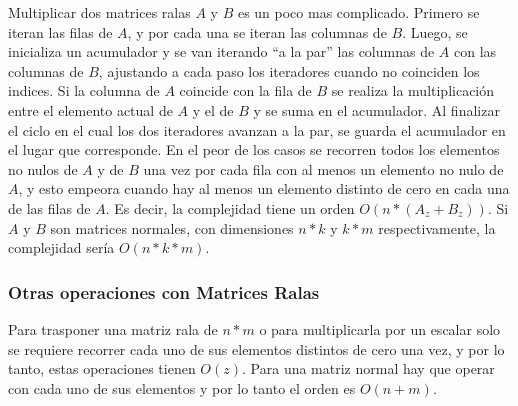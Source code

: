 Multiplicar dos matrices ralas $A$ y $B$ es un poco mas complicado. Primero se
iteran las filas de $A$, y por cada una se iteran las columnas de $B$. Luego,
se inicializa un acumulador y se van iterando ``a la par'' las columnas de $A$
con las columnas de $B$, ajustando a cada paso los iteradores cuando no
coinciden los indices. Si la columna de $A$ coincide con la fila de $B$ se
realiza la multiplicación entre el elemento actual de $A$ y el de $B$ y se suma
en el acumulador. Al finalizar el ciclo en el cual los dos iteradores avanzan a
la par, se guarda el acumulador en el lugar que corresponde. En el peor de los
casos se recorren todos los elementos no nulos de $A$ y de $B$ una vez por cada
fila con al menos un elemento no nulo de $A$, y esto empeora cuando hay al menos
un elemento distinto de cero en cada una de las filas de $A$. Es decir, la
complejidad tiene un orden $O(n * (A_z + B_z))$. Si $A$ y $B$ son matrices
normales, con dimensiones $n * k$ y $k * m$ respectivamente, la complejidad
sería $O(n * k * m)$.

\subsubsection{Otras operaciones con Matrices Ralas}

Para trasponer una matriz rala de $n * m$ o para multiplicarla por un escalar
solo se requiere recorrer cada uno de sus elementos distintos de cero una vez, y
por lo tanto, estas operaciones tienen $O(z)$. Para una matriz normal hay que
operar con cada uno de sus elementos y por lo tanto el orden es $O(n + m)$.